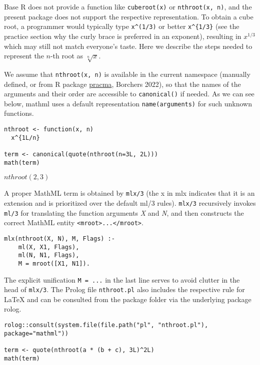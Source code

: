 Base R does not provide a function like \texttt{cuberoot(x)} or
\texttt{nthroot(x,~n)}, and the present package does not support the respective
representation. To obtain a cube root, a programmer would typically type
\texttt{x\^{}(1/3)} or better \texttt{x\^{}\{1/3\}} (see the practice section why the curly
brace is preferred in an exponent), resulting in \(x^{1/3}\) which may
still not match everyone's taste. Here we describe the steps needed to
represent the \(n\)-th root as \(\sqrt[n]x\).

We assume that \texttt{nthroot(x,~n)} is available in the current namespace
(manually defined, or from R package
\href{https://CRAN.R-project.org/package=pracma}{pracma}, Borchers 2022), so
that the names of the arguments and their order are accessible to
\texttt{canonical()} if needed. As we can see below, mathml uses a default
representation \texttt{name(arguments)} for such unknown functions.

\begin{verbatim}
nthroot <- function(x, n)
  x^{1L/n}

term <- canonical(quote(nthroot(n=3L, 2L)))
math(term)
\end{verbatim}

\(nthroot{\left({2}{{,}{3}}\right)}\)

A proper MathML term is obtained by \texttt{mlx/3} (the x in mlx indicates that
it is an extension and is prioritized over the default ml/3 rules).
\texttt{mlx/3} recursively invokes \texttt{ml/3} for translating the function
arguments \emph{X} and \emph{N}, and then constructs the correct MathML entity
\texttt{\textless{}mroot\textgreater{}...\textless{}/mroot\textgreater{}}.

\begin{verbatim}
mlx(nthroot(X, N), M, Flags) :-
    ml(X, X1, Flags),
    ml(N, N1, Flags),
    M = mroot([X1, N1]).
\end{verbatim}

The explicit unification \texttt{M~=~...} in the last line serves to avoid
clutter in the head of \texttt{mlx/3}. The Prolog file \texttt{nthroot.pl} also
includes the respective rule for LaTeX and can be consulted from the
package folder via the underlying package rolog.

\begin{verbatim}
rolog::consult(system.file(file.path("pl", "nthroot.pl"), package="mathml"))

term <- quote(nthroot(a * (b + c), 3L)^2L)
math(term)
\end{verbatim}

